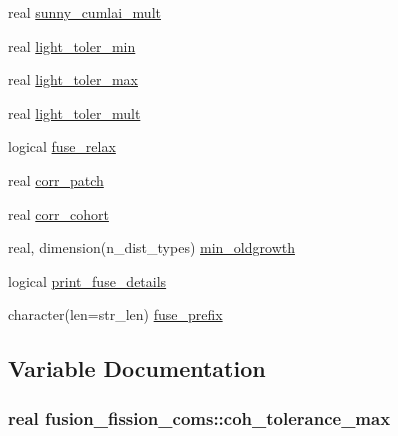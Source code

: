 \begin{DoxyCompactItemize}
\item 
real \hyperlink{namespacefusion__fission__coms_a75dd3af0dafb1c866f6b29f647227a79}{sunny\+\_\+cumlai\+\_\+mult}
\item 
real \hyperlink{namespacefusion__fission__coms_a18de7d0363e629bf717866e1be6d6784}{light\+\_\+toler\+\_\+min}
\item 
real \hyperlink{namespacefusion__fission__coms_a35ae334e26d06d11e6d7373a538694b9}{light\+\_\+toler\+\_\+max}
\item 
real \hyperlink{namespacefusion__fission__coms_aa0ffb9883c43635481ab9abb79b66de3}{light\+\_\+toler\+\_\+mult}
\item 
logical \hyperlink{namespacefusion__fission__coms_ae3996cd91b27f9b130517df7870d5869}{fuse\+\_\+relax}
\item 
real \hyperlink{namespacefusion__fission__coms_aa480a4503cfdfdbfc8c76fa5570672d1}{corr\+\_\+patch}
\item 
real \hyperlink{namespacefusion__fission__coms_ae94ecd34b091879520d758e554ec9efc}{corr\+\_\+cohort}
\item 
real, dimension(n\+\_\+dist\+\_\+types) \hyperlink{namespacefusion__fission__coms_a9cf3e613ab7d8869809784220ab99b1b}{min\+\_\+oldgrowth}
\item 
logical \hyperlink{namespacefusion__fission__coms_afaa756efb130d43d617b625105e6efc3}{print\+\_\+fuse\+\_\+details}
\item 
character(len=str\+\_\+len) \hyperlink{namespacefusion__fission__coms_a459ec82605ae0362d2556be00084a964}{fuse\+\_\+prefix}
\end{DoxyCompactItemize}


\subsection{Variable Documentation}
\hypertarget{namespacefusion__fission__coms_a26b067f4070a314e0e5d2c52088aa6d9}{}
\subsubsection[{coh\+\_\+tolerance\+\_\+max}]{\setlength{\rightskip}{0pt plus 5cm}real fusion\+\_\+fission\+\_\+coms\+::coh\+\_\+tolerance\+\_\+max}\label{namespacefusion__fission__coms_a26b067f4070a314e0e5d2c52088aa6d9}
\hypertarget{namespacefusion__fission__coms_ae94ecd34b091879520d758e554ec9efc}{}

